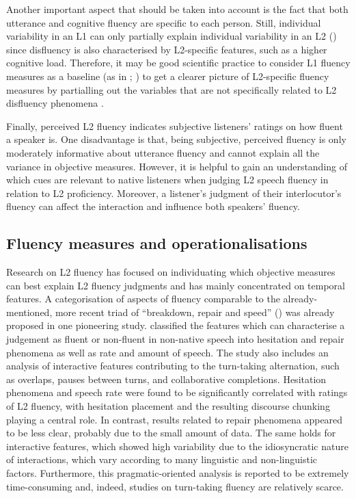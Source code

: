 Another important aspect that should be taken into account is the fact that both utterance and cognitive fluency are specific to each person. Still, individual variability in an L1 can only partially explain individual variability in an L2 (\citealt{DeJongEtAl2013}) since disfluency is also characterised by L2-specific features, such as a higher cognitive load. Therefore, it may be good scientific practice to consider L1 fluency measures as a baseline (as in \citealt{DeJongEtAl2015}; \citealt{SaitoEtAl2018}) to get a clearer picture of L2-specific fluency measures by partialling out the variables that are not specifically related to L2 disfluency phenomena \citep{Segalowitz2010}.

Finally, perceived L2 fluency indicates subjective listeners’ ratings on how fluent a speaker is. One disadvantage is that, being subjective, perceived fluency is only moderately informative about utterance fluency and cannot explain all the variance in objective measures. However, it is helpful to gain an understanding of which cues are relevant to native listeners when judging L2 speech fluency in relation to L2 proficiency. Moreover, a listener’s judgment of their interlocutor’s fluency can affect the interaction and influence both speakers’ fluency.

\subsection{Fluency measures and operationalisations}
\label{sec:3.1.3}
Research on L2 fluency has focused on individuating which objective measures can best explain L2 fluency judgments and has mainly concentrated on temporal features. A categorisation of aspects of fluency comparable to the already-mentioned, more recent triad of “breakdown, repair and speed” (\citealt{TavakoliSkehan2005}) was already proposed in one pioneering study. \citet{Riggenbach1991} classified the features which can characterise a judgement as fluent or non-fluent in non-native speech into hesitation and repair phenomena as well as rate and amount of speech. The study also includes an analysis of interactive features contributing to the turn-taking alternation, such as overlaps, pauses between turns, and collaborative completions. Hesitation phenomena and speech rate were found to be significantly correlated with ratings of L2 fluency, with hesitation placement and the resulting discourse chunking playing a central role. In contrast, results related to repair phenomena appeared to be less clear, probably due to the small amount of data. The same holds for interactive features, which showed high variability due to the idiosyncratic nature of interactions, which vary according to many linguistic and non-linguistic factors. Furthermore, this pragmatic-oriented analysis is reported to be extremely time-consuming and, indeed, studies on turn-taking fluency are relatively scarce.


